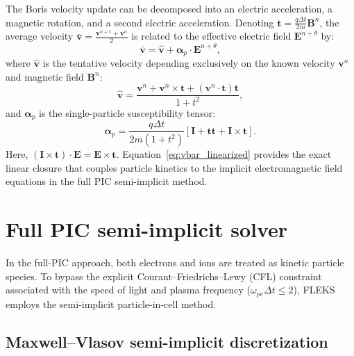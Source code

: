 \documentclass[a4paper, 11pt]{article}
\begin{document}
The Boris velocity update can be decomposed into an electric acceleration, a magnetic rotation, and a second electric acceleration. Denoting $\mathbf{t} = \frac{q\Delta t}{2m}\mathbf{B}^n$, the average velocity $\bar{\mathbf{v}} = \frac{\mathbf{v}^{n+1} + \mathbf{v}^n}{2}$ is related to the effective electric field $\mathbf{E}^{n+\theta}$ by:
\begin{equation}
\bar{\mathbf{v}} = \hat{\mathbf{v}} + \boldsymbol{\alpha}_p \cdot \mathbf{E}^{n+\theta},
\label{eq:vbar_linearized}
\end{equation}
where $\hat{\mathbf{v}}$ is the tentative velocity depending exclusively on the known velocity $\mathbf{v}^n$ and magnetic field $\mathbf{B}^n$:
\begin{equation}
\hat{\mathbf{v}} = \frac{\mathbf{v}^n + \mathbf{v}^n \times \mathbf{t} + (\mathbf{v}^n \cdot \mathbf{t})\mathbf{t}}{1 + t^2},
\end{equation}
and $\boldsymbol{\alpha}_p$ is the single-particle susceptibility tensor:
\begin{equation}
\boldsymbol{\alpha}_p = \frac{q\Delta t}{2m(1 + t^2)} \left[ \mathbf{I} + \mathbf{t}\mathbf{t} + \mathbf{I} \times \mathbf{t} \right].
\end{equation}
Here, $(\mathbf{I} \times \mathbf{t}) \cdot \mathbf{E} = \mathbf{E} \times \mathbf{t}$. Equation~\eqref{eq:vbar_linearized} provides the exact linear closure that couples particle kinetics to the implicit electromagnetic field equations in the full PIC semi-implicit method.

\section{Full PIC semi-implicit solver}
\label{sec:full_pic}

In the full-PIC approach, both electrons and ions are treated as kinetic particle species. To bypass the explicit Courant--Friedrichs--Lewy (CFL) constraint associated with the speed of light and plasma frequency ($\omega_{pe}\Delta t \le 2$), FLEKS employs the semi-implicit particle-in-cell method.

\subsection{Maxwell--Vlasov semi-implicit discretization}
\end{document}
